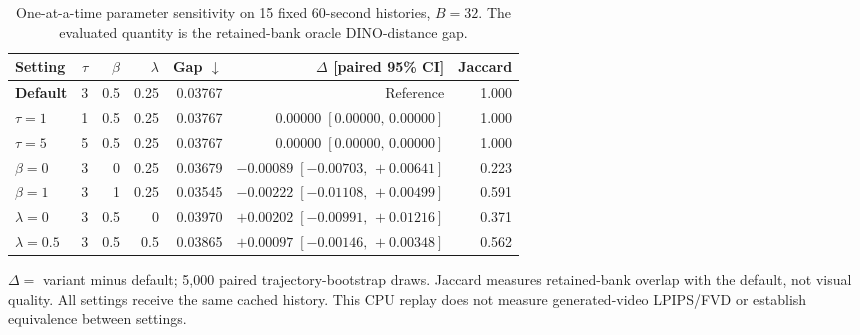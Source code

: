 \begin{table}[!ht]
\centering\small
\caption{One-at-a-time parameter sensitivity on 15 fixed 60-second histories,
$B=32$. The evaluated quantity is the retained-bank oracle DINO-distance gap.}
\label{tab:parameters-replay-preview}
\setlength{\tabcolsep}{4pt}
\begin{tabular*}{\linewidth}{@{\extracolsep{\fill}}lrrrrrr@{}}
\toprule
Setting & $\tau$ & $\beta$ & $\lambda$ & Gap $\downarrow$ & $\Delta$ [paired 95\% CI] & Jaccard \\
\midrule
\textbf{Default} & 3 & 0.5 & 0.25 & 0.03767 & Reference & 1.000 \\
$\tau=1$ & 1 & 0.5 & 0.25 & 0.03767 & $0.00000\;[0.00000,\,0.00000]$ & 1.000 \\
$\tau=5$ & 5 & 0.5 & 0.25 & 0.03767 & $0.00000\;[0.00000,\,0.00000]$ & 1.000 \\
\addlinespace[2pt]
$\beta=0$ & 3 & 0 & 0.25 & 0.03679 & $-0.00089\;[-0.00703,\,+0.00641]$ & 0.223 \\
$\beta=1$ & 3 & 1 & 0.25 & 0.03545 & $-0.00222\;[-0.01108,\,+0.00499]$ & 0.591 \\
\addlinespace[2pt]
$\lambda=0$ & 3 & 0.5 & 0 & 0.03970 & $+0.00202\;[-0.00991,\,+0.01216]$ & 0.371 \\
$\lambda=0.5$ & 3 & 0.5 & 0.5 & 0.03865 & $+0.00097\;[-0.00146,\,+0.00348]$ & 0.562 \\
\bottomrule
\end{tabular*}
\par\smallskip
\begin{minipage}{\linewidth}\footnotesize
$\Delta=$ variant minus default; 5,000 paired trajectory-bootstrap draws.
Jaccard measures retained-bank overlap with the default, not visual quality.
All settings receive the same cached history. This CPU replay does not measure
generated-video LPIPS/FVD or establish equivalence between settings.
\end{minipage}
\end{table}
